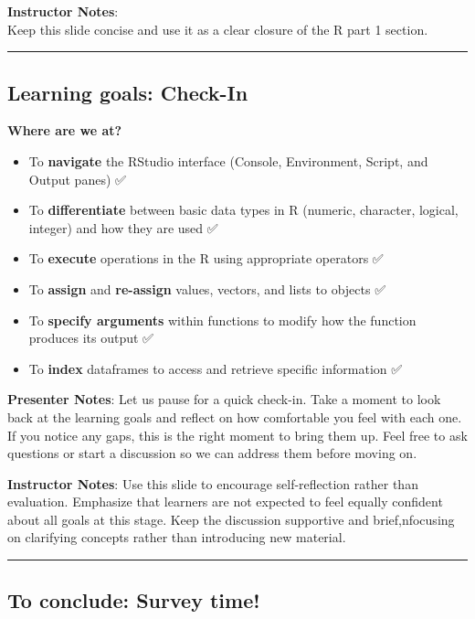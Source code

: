 \documentclass[
  letterpaper,
  DIV=11,
  numbers=noendperiod]{scrartcl}
\providecommand{\tightlist}{%
  \setlength{\itemsep}{0pt}\setlength{\parskip}{0pt}}
\begin{document}
\textbf{Instructor Notes}:\\
Keep this slide concise and use it as a clear closure of the R part 1
section.

\begin{center}\rule{0.5\linewidth}{0.5pt}\end{center}

\subsection{Learning goals: Check-In}\label{learning-goals-check-in}

\textbf{Where are we at?}

\begin{itemize}
\tightlist
\item
  To \textbf{navigate} the RStudio interface (Console, Environment,
  Script, and Output panes) ✅
\item
  To \textbf{differentiate} between basic data types in R (numeric,
  character, logical, integer) and how they are used ✅
\item
  To \textbf{execute} operations in the R using appropriate operators ✅
\item
  To \textbf{assign} and \textbf{re-assign} values, vectors, and lists
  to objects ✅
\item
  To \textbf{specify arguments} within functions to modify how the
  function produces its output ✅
\item
  To \textbf{index} dataframes to access and retrieve specific
  information ✅
\end{itemize}

\textbf{Presenter Notes}: Let us pause for a quick check-in. Take a
moment to look back at the learning goals and reflect on how comfortable
you feel with each one. If you notice any gaps, this is the right moment
to bring them up. Feel free to ask questions or start a discussion so we
can address them before moving on.

\textbf{Instructor Notes}: Use this slide to encourage self-reflection
rather than evaluation. Emphasize that learners are not expected to feel
equally confident about all goals at this stage. Keep the discussion
supportive and brief,nfocusing on clarifying concepts rather than
introducing new material.

\begin{center}\rule{0.5\linewidth}{0.5pt}\end{center}

\subsection{To conclude: Survey time!}\label{to-conclude-survey-time}
\end{document}
